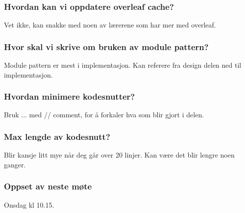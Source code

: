 \subsubsection{Hvordan kan vi oppdatere overleaf cache?}
Vet ikke, kan snakke med noen av lærerene som har mer med overleaf.

\subsubsection{Hvor skal vi skrive om bruken av module pattern?}
Module pattern er mest i implementasjon. Kan referere fra design delen ned til implementasjon.

\subsubsection{Hvordan minimere kodesnutter?}
Bruk ... med // comment, for å forkaler hva som blir gjort i delen.

\subsubsection{Max lengde av kodesnutt?}
Blir kansje litt mye når deg går over 20 linjer. Kan være det blir lengre noen ganger.

\subsubsection{Oppset av neste møte}
Onsdag kl 10.15. 

\newpage